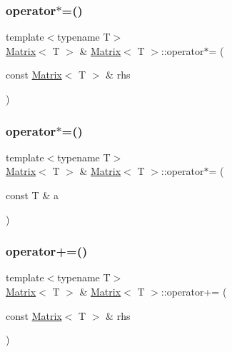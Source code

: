 \mbox{\label{classMatrix_af6a95588910fa9c53feaae71fe88df81}} 
\subsubsection{\texorpdfstring{operator$\ast$=()}{operator*=()}\hspace{0.1cm}{\footnotesize\ttfamily [1/2]}}
{\footnotesize\ttfamily template$<$typename T$>$ \\
\mbox{\hyperlink{classMatrix}{Matrix}}$<$ T $>$ \& \mbox{\hyperlink{classMatrix}{Matrix}}$<$ T $>$\+::operator$\ast$= (\begin{DoxyParamCaption}\item[{const \mbox{\hyperlink{classMatrix}{Matrix}}$<$ T $>$ \&}]{rhs }\end{DoxyParamCaption})\hspace{0.3cm}{\ttfamily [inline]}}

\mbox{\label{classMatrix_a9ac358ade86c1b442aa75852b2dd663a}} 
\subsubsection{\texorpdfstring{operator$\ast$=()}{operator*=()}\hspace{0.1cm}{\footnotesize\ttfamily [2/2]}}
{\footnotesize\ttfamily template$<$typename T$>$ \\
\mbox{\hyperlink{classMatrix}{Matrix}}$<$ T $>$ \& \mbox{\hyperlink{classMatrix}{Matrix}}$<$ T $>$\+::operator$\ast$= (\begin{DoxyParamCaption}\item[{const T \&}]{a }\end{DoxyParamCaption})\hspace{0.3cm}{\ttfamily [inline]}}

\mbox{\label{classMatrix_a36fdb87d0aa1b906eda9fa1cf81a1477}} 
\subsubsection{\texorpdfstring{operator+=()}{operator+=()}\hspace{0.1cm}{\footnotesize\ttfamily [1/2]}}
{\footnotesize\ttfamily template$<$typename T$>$ \\
\mbox{\hyperlink{classMatrix}{Matrix}}$<$ T $>$ \& \mbox{\hyperlink{classMatrix}{Matrix}}$<$ T $>$\+::operator+= (\begin{DoxyParamCaption}\item[{const \mbox{\hyperlink{classMatrix}{Matrix}}$<$ T $>$ \&}]{rhs }\end{DoxyParamCaption})\hspace{0.3cm}{\ttfamily [inline]}}

